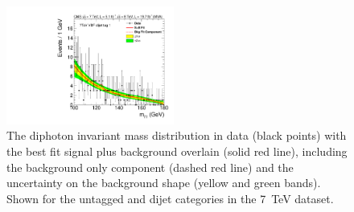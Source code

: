 \begin{figure}
  \includegraphics[width=0.49\textwidth]{results/plots/mgg-cats/mgg_mva_nosub_ch1_cat5_7TeV.pdf}
  \caption{The diphoton invariant mass distribution in data (black points) with the best fit signal plus background overlain (solid red line), including the background only component (dashed red line) and the uncertainty on the background shape (yellow and green bands). Shown for the untagged and dijet categories in the 7~TeV dataset.}
  \label{fig:bfres1}
\end{figure}

